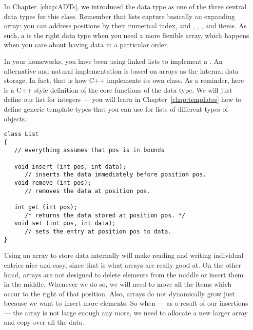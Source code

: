 In Chapter~\ref{chap:ADTs}, we introduced the  data type as
one of the three central data types for this class.
Remember that lists capture basically an expanding array:
you can address positions by their numerical index,
and , , , and  items.
As such, a  is the right data type when you need a more
flexible array, which happens when you care about having
data in a particular order.


In your homeworks, you have been using linked lists to implement a
.
An alternative and natural implementation is based on arrays as the
internal data storage.
In fact, that is how C++ implements its own  class.
As a reminder, here is a C++ style definition of the core functions of
the  data type.
We will just define our list for integers ---
you will learn in Chapter~\ref{chap:templates} how to define generic
template types that you can use for lists of different types of objects.


\begin{verbatim}
class List
{
   // everything assumes that pos is in bounds

   void insert (int pos, int data);
      // inserts the data immediately before position pos.
   void remove (int pos);
      // removes the data at position pos.

   int get (int pos);
      /* returns the data stored at position pos. */
   void set (int pos, int data);
      // sets the entry at position pos to data.
}
\end{verbatim}

Using an array to store data internally will make reading and writing
individual entries nice and easy,
since that is what arrays are really good at.
On the other hand, arrays are not designed to delete elements from the
middle or insert them in the middle.
Whenever we do so, we will need to move all the items which occur to
the right of that position. 
Also, arrays do not dynamically grow just because we want to insert
more elements.
So when --- as a result of our insertions --- the array is
not large enough any more,
we need to allocate a new larger array and copy over all the data.

